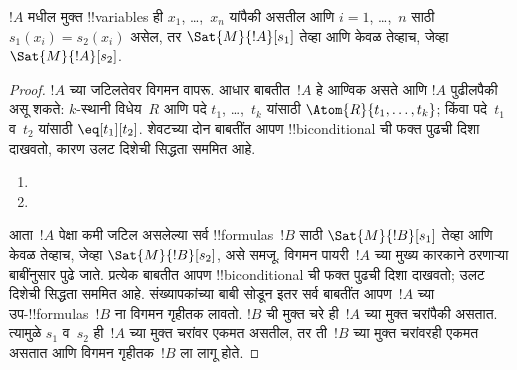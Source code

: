 \documentclass[../../../include/open-logic-section]{subfiles}
\begin{document}
\begin{prop}
$!A$ मधील मुक्त !!{variable}s ही $x_1$, \dots,~$x_n$ यांपैकी असतील आणि
$i = 1$, \dots,~$n$ साठी $s_1(x_i) = s_2(x_i)$ असेल, तर
$\Sat{M}{!A}[s_1]$ तेव्हा आणि केवळ तेव्हाच, जेव्हा
$\Sat{M}{!A}[s_2]$.
\end{prop}

\begin{proof}
$!A$ च्या जटिलतेवर विगमन वापरू. आधार बाबतीत~$!A$ हे आण्विक असते आणि
$!A$ पुढीलपैकी असू शकते:
$k$-स्थानी विधेय~$R$ आणि पदे $t_1$, \dots,~$t_k$ यांसाठी
$\Atom{R}{t_1, \dots, t_k}$; किंवा पदे~$t_1$ व~$t_2$ यांसाठी
$\eq[t_1][t_2]$. शेवटच्या दोन बाबतींत आपण !!{biconditional} ची फक्त
पुढची दिशा दाखवतो, कारण उलट दिशेची सिद्धता सममित आहे.

\begin{enumerate}


\item
\item
\end{enumerate}

आता~$!A$ पेक्षा कमी जटिल असलेल्या सर्व !!{formula}s~$!B$ साठी
$\Sat{M}{!B}[s_1]$ तेव्हा आणि केवळ तेव्हाच, जेव्हा
$\Sat{M}{!B}[s_2]$, असे समजू. विगमन पायरी~$!A$ च्या मुख्य कारकाने
ठरणाऱ्या बाबींनुसार पुढे जाते. प्रत्येक बाबतीत आपण !!{biconditional} ची
फक्त पुढची दिशा दाखवतो; उलट दिशेची सिद्धता सममित आहे. संख्यापकांच्या
बाबी सोडून इतर सर्व बाबतींत आपण~$!A$ च्या उप-!!{formula}s~$!B$ ना
विगमन गृहीतक लावतो. $!B$ ची मुक्त चरे ही~$!A$ च्या मुक्त चरांपैकी
असतात. त्यामुळे $s_1$ व~$s_2$ ही~$!A$ च्या मुक्त चरांवर एकमत असतील,
तर ती~$!B$ च्या मुक्त चरांवरही एकमत असतात आणि विगमन गृहीतक~$!B$ ला
लागू होते.


\end{proof}
\end{document}
